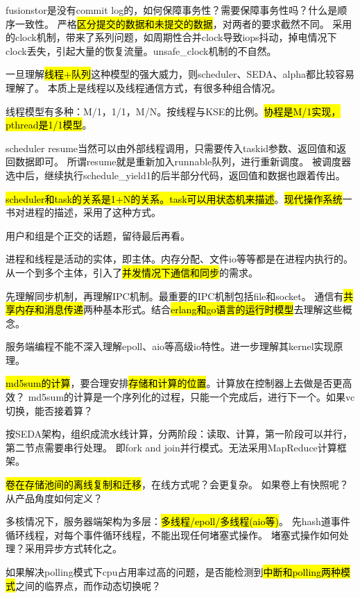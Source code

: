 fusionstor是没有commit log的，如何保障事务性？需要保障事务性吗？什么是顺序一致性。
严格\hl{区分提交的数据和未提交的数据}，对两者的要求截然不同。
采用的clock机制，带来了系列问题，如周期性合并clock导致iops抖动，掉电情况下clock丢失，引起大量的恢复流量。unsafe\_clock机制的不自然。

\dotfill

一旦理解\hl{线程+队列}这种模型的强大威力，则scheduler、SEDA、alpha都比较容易理解了。
本质上是线程以及线程通信方式，有很多种组合情况。

线程模型有多种：M/1，1/1，M/N。按线程与KSE的比例。\hl{协程是M/1实现，pthread是1/1模型}。

scheduler resume当然可以由外部线程调用，只需要传入taskid参数、返回值和返回数据即可。
所谓resume就是重新加入runnable队列，进行重新调度。
被调度器选中后，继续执行schedule\_yield1的后半部分代码，返回值和数据也跟着传出。

\hl{scheduler和task的关系是1+N的关系。task可以用状态机来描述}。\hl{现代操作系统}一书对进程的描述，采用了这种方式。

\dotfill

用户和组是个正交的话题，留待最后再看。

进程和线程是活动的实体，即主体。内存分配、文件io等等都是在进程内执行的。
从一个到多个主体，引入了\hl{并发情况下通信和同步}的需求。

先理解同步机制，再理解IPC机制。最重要的IPC机制包括file和socket。
通信有\hl{共享内存和消息传递}两种基本形式。结合\hl{erlang和go语言的运行时模型}去理解这些概念。

服务端编程不能不深入理解epoll、aio等高级io特性。进一步理解其kernel实现原理。

\hrulefill

\hl{md5sum的计算}，要合理安排\hl{存储和计算的位置}。计算放在控制器上去做是否更高效？
md5sum的计算是一个序列化的过程，只能一个完成后，进行下一个。如果vc切换，能否接着算？

按SEDA架构，组织成流水线计算，分两阶段：读取、计算，第一阶段可以并行，第二节点需要串行处理。
即fork and join并行模式。无法采用MapReduce计算框架。

\hl{卷在存储池间的离线复制和迁移}，在线方式呢？会更复杂。
如果卷上有快照呢？从产品角度如何定义？

多核情况下，服务器端架构为多层：\hl{多线程/epoll/多线程(aio等)}。
先hash道事件循环线程，对每个事件循环线程，不能出现任何堵塞式操作。
堵塞式操作如何处理？采用异步方式转化之。

如果解决polling模式下cpu占用率过高的问题，是否能检测到\hl{中断和polling两种模式}之间的临界点，而作动态切换呢？


